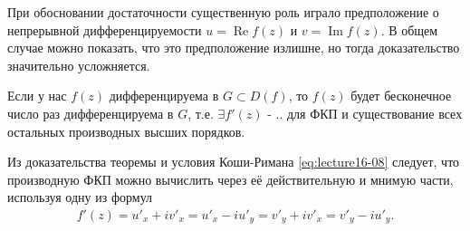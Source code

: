 \begin{notes}
\item При обосновании достаточности существенную роль играло предположение о непрерывной
  дифференцируемости $u = \operatorname{Re}f(z)$ и $v = \operatorname{Im}f(z)$. В общем случае
  можно показать, что это предположение излишне, но тогда доказательство значительно усложняется.
\item Если у нас $f(z)$ дифференцируема в $G \subset D(f)$, то $f(z)$ будет бесконечное число
  раз дифференцируема в $G$, т.е. $\exists f'(z)$ - .. для ФКП и существование всех остальных
  производных высших порядков.
\item Из доказательства теоремы и условия Коши-Римана \eqref{eq:lecture16-08} следует, что
  производную ФКП можно вычислить через её действительную и мнимую части, используя одну из
  формул
  \begin{align*}
    f'(z) = u'_x + iv'_x = u'_x - iu'_y = v'_y + iv'_x = v'_y - iu'_y.
  \end{align*}
\end{notes}
